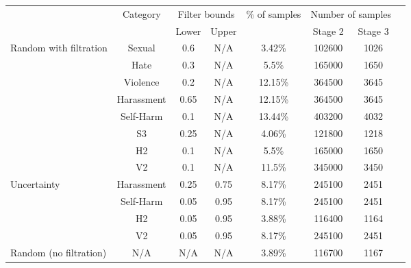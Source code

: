 \begin{tabular}{p{2.1cm}c|cccccc}
\toprule
& Category & \multicolumn{2}{c}{Filter bounds} & \% of samples & \multicolumn{2}{c}{Number of samples} \\
& & Lower & Upper & & Stage 2 & Stage 3 \\
\midrule
Random with filtration  
& Sexual & 0.6 & N/A & 3.42\% & 102600 & 1026 \\
& Hate & 0.3 & N/A & 5.5\% & 165000 & 1650  \\
& Violence & 0.2 & N/A & 12.15\% & 364500 & 3645 \\
& Harassment & 0.65 & N/A & 12.15\% & 364500 & 3645 \\
& Self-Harm & 0.1 & N/A & 13.44\% & 403200 & 4032 \\
& S3 & 0.25 & N/A & 4.06\% & 121800 & 1218 \\
& H2 & 0.1 & N/A & 5.5\% & 165000 & 1650 \\
& V2 & 0.1 & N/A & 11.5\% & 345000 & 3450 \\
\midrule
Uncertainty
& Harassment & 0.25 & 0.75 & 8.17\% & 245100 & 2451 \\
& Self-Harm & 0.05 & 0.95 & 8.17\% & 245100 & 2451 \\
& H2 & 0.05 & 0.95 & 3.88\% & 116400 & 1164 \\
& V2 & 0.05 & 0.95 & 8.17\% & 245100 & 2451 \\
\midrule
Random (no filtration)
& N/A & N/A & N/A & 3.89\% & 116700 & 1167 \\
\bottomrule
\end{tabular}